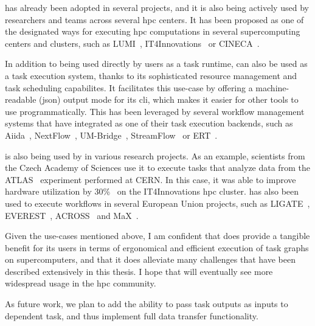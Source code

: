 \hyperqueue{} has already been adopted in several projects, and it is also being actively
used by researchers and teams across several \gls{hpc} centers. It has been proposed
as one of the designated ways for executing \gls{hpc} computations in several
supercomputing centers and clusters, such as LUMI~\cite{it4i-lumi},
IT4Innovations~\cite{it4i-hq} or CINECA~\cite{cineca}.

In addition to being used directly by users as a task runtime, \hyperqueue{} can also be
used as a task execution system, thanks to its sophisticated resource management and task
scheduling capabilites. It facilitates this use-case by offering a machine-readable
(\gls{json}) output mode for its \gls{cli}, which makes it easier for
other tools to use \hyperqueue{} programmatically. This has been leveraged by several
workflow management systems that have integrated \hyperqueue{} as one of their task
execution backends, such as Aiida~\cite{aiida-hq}, NextFlow~\cite{nextflow-hq},
UM-Bridge~\cite{umbridge}, StreamFlow~\cite{streamflow-hq} or
ERT~\cite{ert}.

\hyperqueue{} is also being used by in various research projects. As an example,
scientists from the Czech Academy of Sciences use it to execute tasks that analyze data from the
ATLAS~\cite{atlas} experiment performed at CERN. In this case, it was able to improve
hardware utilization by 30\%~\cite{cern-hq} on the IT4Innovations \gls{hpc}
cluster. \hyperqueue{} has also been used to execute workflows in several European Union
projects, such as LIGATE~\cite{ligate}, EVEREST~\cite{everest},
ACROSS~\cite{across} and MaX~\cite{max}.

Given the use-cases mentioned above, I am confident that \hyperqueue{} does provide a
tangible benefit for its users in terms of ergonomical and efficient execution of task graphs on
supercomputers, and that it does alleviate many challenges that have been described
extensively in this thesis. I hope that \hyperqueue{} will eventually see more widespread
usage in the \gls{hpc} community.

As future work, we plan to add the ability to pass task outputs as inputs to dependent task, and
thus implement full data transfer functionality.
